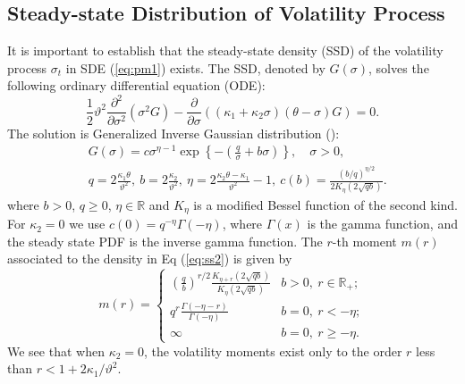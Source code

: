 \documentclass[11pt,a4paper] {article}
\begin{document}
 

\subsection{Steady-state Distribution of Volatility Process}\label{sec:steady_state}

It is important to establish that the steady-state density (SSD) of the volatility process $\sigma_{t}$ in SDE (\ref{eq:pm1}) exists. The SSD, denoted by $G(\sigma)$, solves the following ordinary differential equation (ODE):
\begin{equation} \label {eq:ss1}
\frac{1}{2}\vartheta^{2}\frac{\partial^2}{\partial\sigma^2}\left(\sigma^{2}G\right) - \frac{\partial}{\partial\sigma}\left((\kappa_{1} + \kappa_2\sigma)(\theta - \sigma)G\right)=0.
\end{equation}
The solution is Generalized Inverse Gaussian distribution (\cite{Jorgensen1982}):
\begin{equation} \label{eq:ss2}
\begin{split}
& G(\sigma) = c \sigma^{\eta-1} \exp\left\{ -\left(\frac{q}{\sigma} +b\sigma \right)\right\},\quad \sigma>0,\\
&q = 2\frac{\kappa_1\theta}{\vartheta^2}, \ b = 2\frac{\kappa_2}{\vartheta^2},\  \eta = 2\frac{\kappa_{2}\theta-\kappa_{1}}{\vartheta^{2}}-1, \ c(b) =\frac{\left(b/q\right)^{\eta/2}}{2K_{\eta}\left(2\sqrt{qb}\right)}.
\end{split}
\end{equation}
where $b>0$, $q\ge 0$, $\eta\in\mathbb{R}$ and $K_{\eta}$ is a modified Bessel function of the second kind. For $\kappa_{2}=0$ we use $c(0)=q^{-\eta}\Gamma(-\eta)$, where $\Gamma(x)$ is the gamma function, and the steady state PDF is the inverse gamma function. The $r$-th moment $m(r)$ associated to the density in Eq (\ref{eq:ss2}) is given by
\begin{equation} \label{eq:ss3}
m(r)= \begin{cases} 
      \left(\frac{q}{b}\right)^{r/2}\frac{K_{\eta+r}\left(2\sqrt{qb}\right)}{K_{\eta}\left(2\sqrt{qb}\right)} & b>0, \ r \in \mathbb{R}_{+}; \\
      q^{r}\frac{\Gamma(-\eta-r)}{\Gamma(-\eta)} & b = 0, \ r < -\eta; \\
      \infty & b = 0, \ r \geq -\eta.
   \end{cases}
\end{equation}
We see that when $\kappa_2=0$, the volatility moments exist only to the order $r$ less than $r<1+2\kappa_{1}/\vartheta^{2}$.
\end{document}
